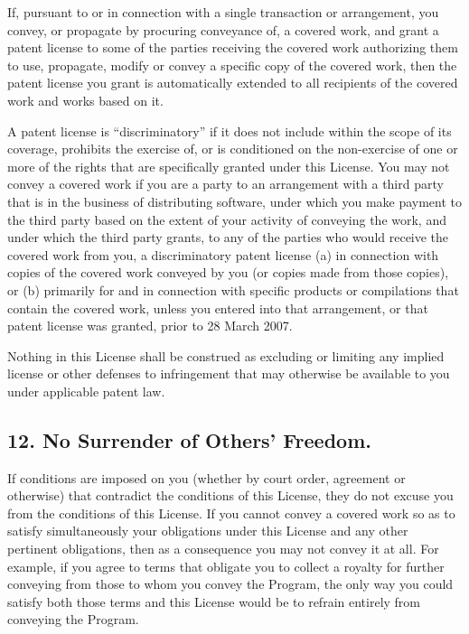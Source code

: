 \documentclass[letterpaper,10pt,english]{sphinxmanual}
\begin{document}
If, pursuant to or in connection with a single transaction or
arrangement, you convey, or propagate by procuring conveyance of, a
covered work, and grant a patent license to some of the parties
receiving the covered work authorizing them to use, propagate, modify
or convey a specific copy of the covered work, then the patent license
you grant is automatically extended to all recipients of the covered
work and works based on it.

A patent license is ``discriminatory'' if it does not include within
the scope of its coverage, prohibits the exercise of, or is
conditioned on the non-exercise of one or more of the rights that are
specifically granted under this License.  You may not convey a covered
work if you are a party to an arrangement with a third party that is
in the business of distributing software, under which you make payment
to the third party based on the extent of your activity of conveying
the work, and under which the third party grants, to any of the
parties who would receive the covered work from you, a discriminatory
patent license (a) in connection with copies of the covered work
conveyed by you (or copies made from those copies), or (b) primarily
for and in connection with specific products or compilations that
contain the covered work, unless you entered into that arrangement,
or that patent license was granted, prior to 28 March 2007.

Nothing in this License shall be construed as excluding or limiting
any implied license or other defenses to infringement that may
otherwise be available to you under applicable patent law.


\subsection{12. No Surrender of Others' Freedom.}
\label{license:no-surrender-of-others-freedom}
If conditions are imposed on you (whether by court order, agreement or
otherwise) that contradict the conditions of this License, they do not
excuse you from the conditions of this License.  If you cannot convey a
covered work so as to satisfy simultaneously your obligations under this
License and any other pertinent obligations, then as a consequence you may
not convey it at all.  For example, if you agree to terms that obligate you
to collect a royalty for further conveying from those to whom you convey
the Program, the only way you could satisfy both those terms and this
License would be to refrain entirely from conveying the Program.
\end{document}
